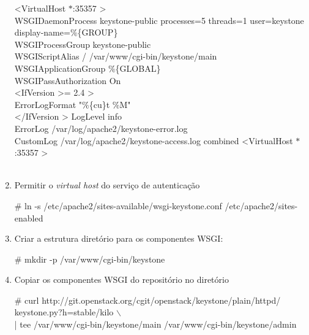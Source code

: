 \begin{enumerate}
\begin{snugshade}
  				\textless VirtualHost $\ast$:35357 \textgreater\\ 
				\hspace*{2 cm}WSGIDaemonProcess keystone-public processes=5 threads=1 user=keystone display-name=$\%$\{GROUP\} \\
				\hspace*{2 cm} WSGIProcessGroup keystone-public \\
				\hspace*{2 cm} WSGIScriptAlias / /var/www/cgi-bin/keystone/main\\
				\hspace*{2 cm} WSGIApplicationGroup $\%$\{GLOBAL\} \\
				\hspace*{2 cm} WSGIPassAuthorization On \\
				\hspace*{2 cm} \textless IfVersion \textgreater = 2.4 \textgreater \\
				\hspace*{3 cm}	ErrorLogFormat "$\%$\{cu\}t \%M" \\
				\hspace*{2 cm} \textless /IfVersion \textgreater
				\hspace*{2 cm} LogLevel info \\
				\hspace*{2 cm} ErrorLog /var/log/apache2/keystone-error.log \\
				\hspace*{2 cm} CustomLog /var/log/apache2/keystone-access.log combined
       			\textless VirtualHost $\ast$:35357 \textgreater \\ \\
			\end{snugshade}
			
			\item Permitir o \emph{virtual host} do serviço de autenticação
			\begin{snugshade}
				\# ln -s /etc/apache2/sites-available/wsgi-keystone.conf /etc/apache2/sites-enabled
			\end{snugshade}
			
			\item Criar a estrutura diretório para os componentes WSGI:
			\begin{snugshade}
				\# mkdir -p /var/www/cgi-bin/keystone
			\end{snugshade}
			
			\item Copiar os componentes WSGI do repositório no diretório
			\begin{snugshade}
				\# curl http://git.openstack.org/cgit/openstack/keystone/plain/httpd/
keystone.py?h=stable/kilo $\backslash$ \\ | tee /var/www/cgi-bin/keystone/main /var/www/cgi-bin/keystone/admin
			\end{snugshade}
			

\end{enumerate}
